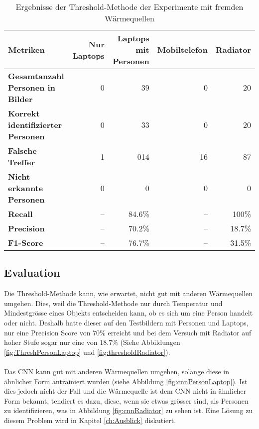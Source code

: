 {\begin{table}[H]
\begin{tabularx}{.9\textwidth}{Xrrrr}
			\hline
			\textbf{Metriken} & \textbf{Nur Laptops} & \textbf{Laptops mit Personen} & \textbf{Mobiltelefon} & \textbf{Radiator}\\
			\hline 
			\textbf{Gesamtanzahl Personen in Bilder} & 0 & 39 & 0 & 20\\
			\hline
			\textbf{Korrekt identifizierter Personen} & 0 & 33 & 0 & 20\\
			\hline
			\textbf{Falsche Treffer} & 1 & 014 & 16 & 87\\
			\hline
			\textbf{Nicht erkannte Personen} & 0 & 0 & 0 & 0\\
			\hline
			\textbf{Recall} & -- & 84.6\% & -- & 100\%\\
			\hline  
			\textbf{Precision} & -- & 70.2\% & -- & 18.7\%\\
			\hline
			\textbf{F1-Score} & -- & 76.7\% & -- & 31.5\%\\
			\hline
		\end{tabularx}
		\caption{Ergebnisse der Threshold-Methode der Experimente mit fremden Wärmequellen}
		\label{tbl:heatSourcesThresh}
	\end{table}
}

\subsection{Evaluation}

Die Threshold-Methode kann, wie erwartet, nicht gut mit anderen Wärmequellen umgehen. Dies, weil die Threshold-Methode nur durch Temperatur und Mindestgrösse eines Objekts entscheiden kann, ob es sich um eine Person handelt oder nicht. Deshalb hatte dieser auf den Testbildern mit Personen und Laptops, nur eine Precision Score von 70\% erreicht und bei dem Versuch mit Radiator auf hoher Stufe sogar nur eine von 18.7\% (Siehe Abbildungen  \ref{fig:ThreshPersonLaptop} und \ref{fig:thresholdRadiator}).\\
\\
Das \gls{CNN} kann gut mit anderen Wärmequellen umgehen, solange diese in ähnlicher Form antrainiert wurden (siehe Abbildung \ref{fig:cnnPersonLaptop}). Ist dies jedoch nicht der Fall und die Wärmequelle ist dem \gls{CNN} nicht in ähnlicher Form bekannt, tendiert es dazu, diese, wenn sie etwas grösser sind, als Personen zu identifizieren, was in Abbildung \ref{fig:cnnRadiator} zu sehen ist. Eine Lösung zu diesem Problem wird in Kapitel \ref{ch:Ausblick} diskutiert. 


